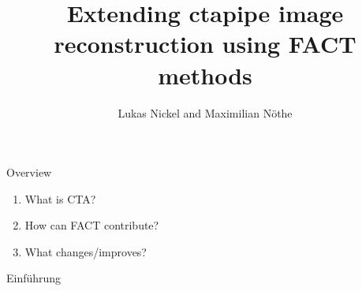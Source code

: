 \documentclass[aspectratio=1610, 9pt]{beamer}
\title{Extending ctapipe image reconstruction using FACT methods}
\author[L Nickel/M.~Nöthe]{Lukas Nickel and Maximilian Nöthe}
\begin{document}
\maketitle

\begin{frame}{Overview}
 \begin{enumerate}
   \item What is CTA?
   \item How can FACT contribute?
   \item What changes/improves?
 \end{enumerate}
\end{frame}

\begin{frame}{Einführung}
  \tableofcontents
\end{frame}






\end{document}
